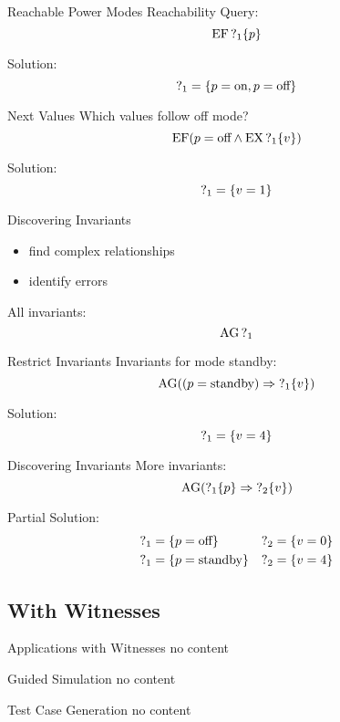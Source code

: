 \begin{frame}{Reachable Power Modes}
  Reachability Query:
  \[\operatorname{EF} \operatorname{?}_1\{p\}\]

  Solution:
  \[ \operatorname{?}_1 = \{p = \text{on}, p = \text{off}\} \]
\end{frame}

\begin{frame}{Next Values}
  Which values follow off mode?
  \[ \operatorname{EF} (p = \text{off} \land \operatorname{EX}\operatorname{?}_1\{v\}) \]

  Solution:
  \[ \operatorname{?}_1 = \{v = 1\} \]
\end{frame}

\begin{frame}{Discovering Invariants}
  \begin{itemize}
    \item find complex relationships
    \item identify errors
  \end{itemize}

  All invariants:
  \[ \operatorname{AG} \operatorname{?}_1 \]
\end{frame}

\begin{frame}{Restrict Invariants}
  Invariants for mode standby:
  \[ \operatorname{AG} ((p = \text{standby}) \Rightarrow \operatorname{?}_1\{v\}) \]

  Solution:
  \[ \operatorname{?}_1 = \{v = 4\} \]
\end{frame}

\begin{frame}{Discovering Invariants}
  More invariants:
  \[ \operatorname{AG} (\operatorname{?}_1\{p\} \Rightarrow \operatorname{?}_2\{v\}) \]
  
  Partial Solution:
  \begin{align*}
    \operatorname{?}_1 &= \{p = \text{off}\} &\operatorname{?}_2 &= \{v = 0\} \\
    \operatorname{?}_1 &= \{p = \text{standby}\} &\operatorname{?}_2 &= \{v = 4\}
  \end{align*}
\end{frame}


\subsection{With Witnesses} 

\begin{frame}{Applications with Witnesses}
  no content
\end{frame}

\begin{frame}{Guided Simulation}
  no content
\end{frame}

\begin{frame}{Test Case Generation}
  no content
\end{frame}
